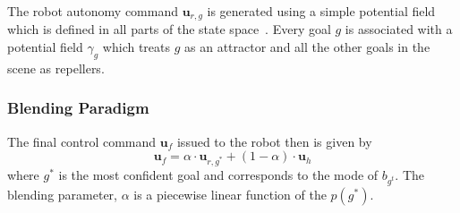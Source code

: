 \documentclass[conference]{IEEEtran}
\newcommand{\norm}[1]{\left\lVert#1\right\rVert}
\begin{document}
The robot autonomy command $\boldsymbol{u}_{r,g}$ is generated using a simple potential field which is defined in all parts of the state space~\citep{khatib1986real}. Every goal $g$ is associated with a potential field $\gamma_g$ which treats $g$ as an attractor and all the other goals in the scene as repellers. 
\subsubsection{Blending Paradigm}\label{sssec:blending}
The final control command $\boldsymbol{u}_f$ issued to the robot then is given by
\begin{equation*}
\boldsymbol{u}_f = \alpha\cdot \boldsymbol{u}_{r,g^*} + (1 - \alpha)\cdot \boldsymbol{u}_h
\end{equation*}
where $g^*$ is the most confident goal and corresponds to the mode of $b_{g^t}$. 
The blending parameter, $\alpha$ is a piecewise linear function of the $p(g^*)$.
\end{document}
